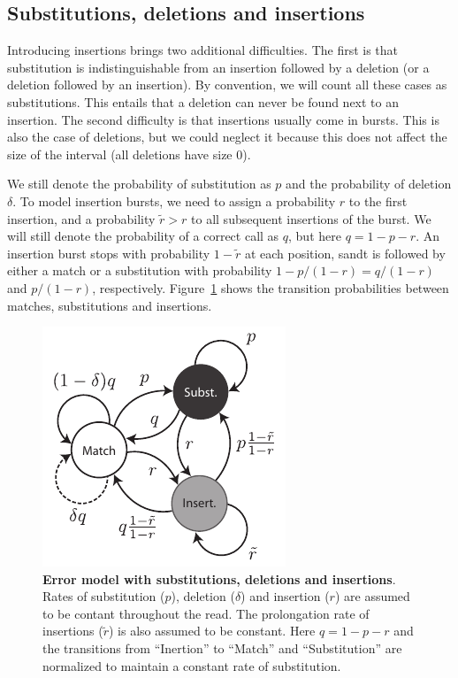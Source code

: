 \documentclass{article}
\begin{document}
\subsection{Substitutions, deletions and insertions}
\label{sec:insertions}

Introducing insertions brings two additional difficulties. The first is
that substitution is indistinguishable from an insertion followed by a
deletion (or a deletion followed by an insertion). By convention, we will
count all these cases as substitutions. This entails that a deletion can
never be found next to an insertion. The second difficulty is that
insertions usually come in bursts. This is also the case of deletions, but
we could neglect it because this does not affect the size of the interval
(all deletions have size $0$). 

We still denote the probability of substitution as $p$ and the probability
of deletion $\delta$. To model insertion bursts, we need to assign a
probability $r$ to the first insertion, and a probability $\tilde{r} > r$
to all subsequent insertions of the burst. We will still denote the
probability of a correct call as $q$, but here $q = 1-p-r$.  An insertion
burst stops with probability $1-\tilde{r}$ at each position, sandt is
followed by either a match or a substitution with probability $1-p/(1-r) =
q/(1-r)$ and $p/(1-r)$, respectively. Figure~\ref{fig:insertions} shows
the transition probabilities between matches, substitutions and
insertions.

\begin{figure}[h]
\centering
\includegraphics[scale=0.9]{insertions.pdf}
\caption{\textbf{Error model with substitutions, deletions and
insertions}. Rates of substitution ($p$), deletion ($\delta$) and
insertion ($r$) are assumed to be contant throughout the read. The
prolongation rate of insertions ($\tilde{r}$) is also assumed to be
constant. Here $q = 1-p-r$ and the transitions from ``Inertion'' to
``Match'' and ``Substitution'' are normalized to maintain a constant rate
of substitution.}
\label{fig:insertions}
\end{figure}
\end{document}

